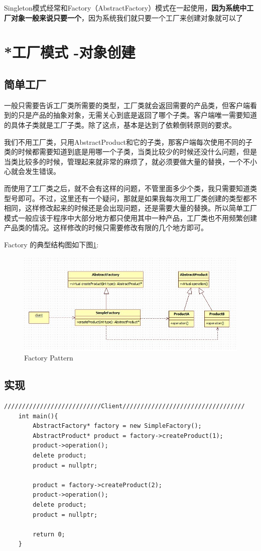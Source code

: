 \documentclass[UTF8,a4paper,12pt]{ctexbook}
\begin{document}
		Singleton模式经常和Factory（AbstractFactory）模式在一起使用，\textbf{因为系统中工厂对象一般来说只要一个}，因为系统我们就只要一个工厂来创建对象就可以了
\newpage
\section{*工厂模式 -对象创建}
	\subsection{简单工厂}
		一般只需要告诉工厂类所需要的类型，工厂类就会返回需要的产品类，但客户端看到的只是产品的抽象对象，无需关心到底是返回了哪个子类。客户端唯一需要知道的具体子类就是工厂子类。除了这点，基本是达到了依赖倒转原则的要求。
		
		我们不用工厂类，只用AbstractProduct和它的子类，那客户端每次使用不同的子类的时候都需要知道到底是用哪一个子类，当类比较少的时候还没什么问题，但是当类比较多的时候，管理起来就非常的麻烦了，就必须要做大量的替换，一个不小心就会发生错误。
		
		而使用了工厂类之后，就不会有这样的问题，不管里面多少个类，我只需要知道类型号即可。不过，这里还有一个疑问，那就是如果我每次用工厂类创建的类型都不相同，这样修改起来的时候还是会出现问题，还是需要大量的替换。所以简单工厂模式一般应该于程序中大部分地方都只使用其中一种产品，工厂类也不用频繁创建产品类的情况。这样修改的时候只需要修改有限的几个地方即可。
		
		Factory 的典型结构图如下图\ref{FactorySimple}:
		\begin{figure}[h]
			\centering
			\includegraphics[width = 14cm]{FactorySimple.jpg}
			\caption{Factory Pattern}
			\label{FactorySimple}
		\end{figure}
	\subsection{实现}	
\begin{lstlisting}
///////////////////////////Client//////////////////////////////////
	int main(){
		AbstractFactory* factory = new SimpleFactory();
		AbstractProduct* product = factory->createProduct(1);
		product->operation();
		delete product;
		product = nullptr;
	
		product = factory->createProduct(2);
		product->operation();
		delete product;
		product = nullptr;
		
		return 0;
	}
\end{lstlisting}
\end{document}
